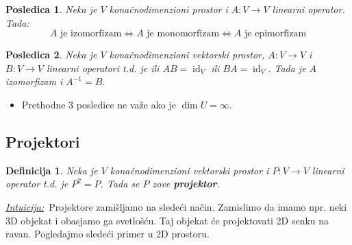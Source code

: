 \documentclass[a4paper,12pt,twoside]{report}
\newtheorem{definition}{Definicija}[section]
\newtheorem{corollary}{Posledica}[theorem]
\numberwithin{algorithm}{section}
\newcommand{\intuicija}{\noindent\underline{\textit{Intuicija:}}\ }
\begin{document}
\begin{corollary}
    Neka je $V$ konačnodimenzioni prostor i $A: V \to V$ linearni operator. Tada:
    \[ A\text{ je izomorfizam} \iff A \text{ je monomorfizam} \iff A \text{ je epimorfizam} \]
\end{corollary}

\begin{corollary}
    Neka je $V$ konačnodimenzioni vektorski prostor, $A:V \to V$ i \linebreak$ B: V \to V$ linearni operatori t.d. je ili $AB = \operatorname{id}_V$ ili
    $BA = \operatorname{id}_V$. Tada je $A$ izomorfizam i $A^{-1} = B$.
\end{corollary}
\vfill
\begin{itemize}
    \item Prethodne 3 posledice ne važe ako je $\dim U = \infty$.
\end{itemize}
\vfill
\newpage

\subsection{Projektori}
\label{projektori}
\begin{definition}
    Neka je $V$ konačnodimenzioni vektorski prostor i $P: V \to V$ linearni operator t.d. je $P^2 = P$. Tada se $P$ zove \textbf{projektor}.
\end{definition}

\intuicija Projektore zamišljamo na sledeći način. Zamislimo da imamo npr. neki 3D objekat i obasjamo ga svetlošću. Taj objekat 
će projektovati 2D senku na ravan. Pogledajmo sledeći primer u 2D prostoru.

\begin{figure}[!h]
        \centering
    \end{figure}
\end{document}
